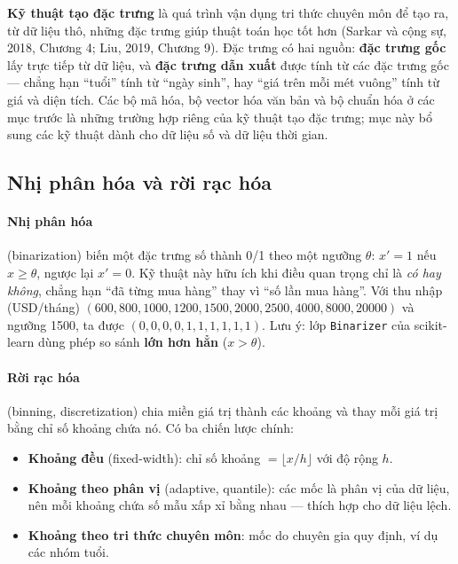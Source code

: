\textbf{Kỹ thuật tạo đặc trưng} là quá trình vận dụng tri thức chuyên môn để tạo ra, từ dữ liệu thô, những đặc trưng giúp thuật toán học tốt hơn (Sarkar và cộng sự, 2018, Chương 4; Liu, 2019, Chương 9). Đặc trưng có hai nguồn: \textbf{đặc trưng gốc} lấy trực tiếp từ dữ liệu, và \textbf{đặc trưng dẫn xuất} được tính từ các đặc trưng gốc --- chẳng hạn ``tuổi'' tính từ ``ngày sinh'', hay ``giá trên mỗi mét vuông'' tính từ giá và diện tích. Các bộ mã hóa, bộ vector hóa văn bản và bộ chuẩn hóa ở các mục trước là những trường hợp riêng của kỹ thuật tạo đặc trưng; mục này bổ sung các kỹ thuật dành cho dữ liệu số và dữ liệu thời gian.

\subsection{Nhị phân hóa và rời rạc hóa}

\paragraph{Nhị phân hóa} (binarization) biến một đặc trưng số thành 0/1 theo một ngưỡng $\theta$: $x' = 1$ nếu $x \geq \theta$, ngược lại $x' = 0$. Kỹ thuật này hữu ích khi điều quan trọng chỉ là \textit{có hay không}, chẳng hạn ``đã từng mua hàng'' thay vì ``số lần mua hàng''. Với thu nhập (USD/tháng) $(600, 800, 1000, 1200, 1500, 2000, 2500, 4000, 8000, 20000)$ và ngưỡng 1500, ta được $(0, 0, 0, 0, 1, 1, 1, 1, 1, 1)$. Lưu ý: lớp \texttt{Binarizer} của scikit-learn dùng phép so sánh \textbf{lớn hơn hẳn} ($x > \theta$).

\paragraph{Rời rạc hóa} (binning, discretization) chia miền giá trị thành các khoảng và thay mỗi giá trị bằng chỉ số khoảng chứa nó. Có ba chiến lược chính:
\begin{itemize}
    \item \textbf{Khoảng đều} (fixed-width): chỉ số khoảng $= \lfloor x / h \rfloor$ với độ rộng $h$.
    \item \textbf{Khoảng theo phân vị} (adaptive, quantile): các mốc là phân vị của dữ liệu, nên mỗi khoảng chứa số mẫu xấp xỉ bằng nhau --- thích hợp cho dữ liệu lệch.
    \item \textbf{Khoảng theo tri thức chuyên môn}: mốc do chuyên gia quy định, ví dụ các nhóm tuổi.
\end{itemize}

